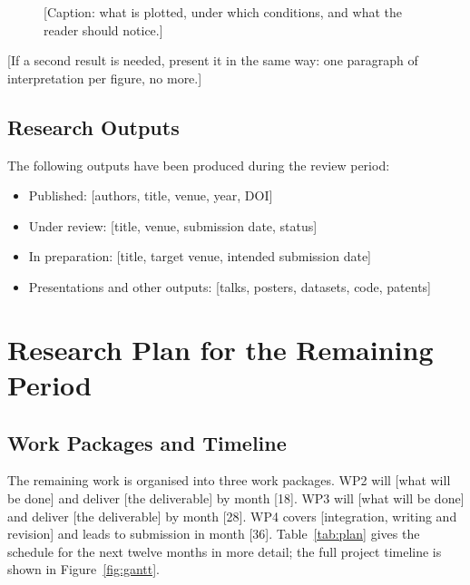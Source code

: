 \documentclass{article}
\begin{document}
\begin{figure}[htbp]
\centering
\caption{[Caption: what is plotted, under which conditions, and what the reader should notice.]}
\label{fig:result1}
\end{figure}

[If a second result is needed, present it in the same way: one paragraph of interpretation per
figure, no more.]

\subsection{Research Outputs}
The following outputs have been produced during the review period:
\begin{itemize}[leftmargin=*]
    \item Published: [authors, title, venue, year, DOI]
    \item Under review: [title, venue, submission date, status]
    \item In preparation: [title, target venue, intended submission date]
    \item Presentations and other outputs: [talks, posters, datasets, code, patents]
\end{itemize}

\section{Research Plan for the Remaining Period}

\subsection{Work Packages and Timeline}
The remaining work is organised into three work packages. WP2 will [what will be done] and
deliver [the deliverable] by month [18]. WP3 will [what will be done] and deliver [the
deliverable] by month [28]. WP4 covers [integration, writing and revision] and leads to
submission in month [36]. Table~\ref{tab:plan} gives the schedule for the next twelve months in
more detail; the full project timeline is shown in Figure~\ref{fig:gantt}.
\end{document}
